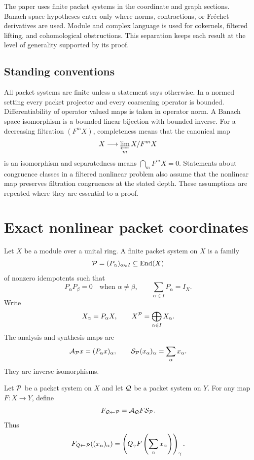 The paper uses finite packet systems in the coordinate and graph sections.  Banach space hypotheses enter only where norms, contractions, or Fr\'echet derivatives are used.  Module and complex language is used for cokernels, filtered lifting, and cohomological obstructions.  This separation keeps each result at the level of generality supported by its proof.

\subsection*{Standing conventions}
All packet systems are finite unless a statement says otherwise.  In a normed setting every packet projector and every coarsening operator is bounded.  Differentiability of operator valued maps is taken in operator norm.  A Banach space isomorphism is a bounded linear bijection with bounded inverse.  For a decreasing filtration $(F^mX)$, completeness means that the canonical map
\[
X\longrightarrow\varprojlim_m X/F^mX
\]
is an isomorphism and separatedness means $\bigcap_mF^mX=0$.  Statements about congruence classes in a filtered nonlinear problem also assume that the nonlinear map preserves filtration congruences at the stated depth.  These assumptions are repeated where they are essential to a proof.

\section{Exact nonlinear packet coordinates}\label{sec:nonlinear_coordinates}

Let $X$ be a module over a unital ring.  A finite packet system on $X$ is a family
\[
\mathcal P=(P_\alpha)_{\alpha\in I}\subseteq\operatorname{End}(X)
\]
of nonzero idempotents such that
\[
P_\alpha P_\beta=0
\quad\text{when }\alpha\ne\beta,
\qquad
\sum_{\alpha\in I}P_\alpha=I_X.
\]
Write
\[
X_\alpha=P_\alpha X,
\qquad
X^{\mathcal P}=\bigoplus_{\alpha\in I}X_\alpha.
\]
The analysis and synthesis maps are
\[
\mathcal A_{\mathcal P}x=(P_\alpha x)_\alpha,
\qquad
\mathcal S_{\mathcal P}(x_\alpha)_\alpha=\sum_\alpha x_\alpha.
\]
They are inverse isomorphisms.

\begin{definition}\label{def:nonlinear_packet_map}
Let $\mathcal P$ be a packet system on $X$ and let $\mathcal Q$ be a packet system on $Y$.  For any map $F:X\to Y$, define
\[
F_{\mathcal Q\leftarrow\mathcal P}
=
\mathcal A_{\mathcal Q}F\mathcal S_{\mathcal P}.
\]
Thus
\[
F_{\mathcal Q\leftarrow\mathcal P}((x_\alpha)_\alpha)
=
\left(
Q_\gamma F\left(\sum_\alpha x_\alpha\right)
\right)_\gamma.
\]
\end{definition}

